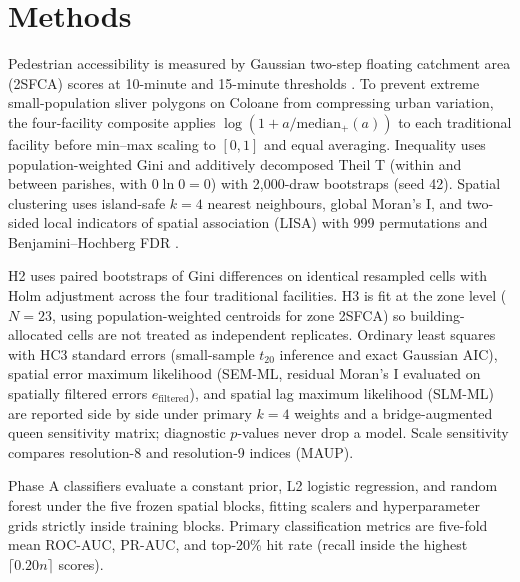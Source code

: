 \documentclass[11pt,a4paper]{article}
\begin{document}
\section{Methods}
Pedestrian accessibility is measured by Gaussian two-step floating catchment area (2SFCA) scores at 10-minute and 15-minute thresholds \citep{luo2003,dai2010}. To prevent extreme small-population sliver polygons on Coloane from compressing urban variation, the four-facility composite applies \(\log(1 + a / \mathrm{median}_{+}(a))\) to each traditional facility before min--max scaling to \([0,1]\) and equal averaging. Inequality uses population-weighted Gini and additively decomposed Theil T (within and between parishes, with \(0\ln 0 = 0\)) with 2,000-draw bootstraps (seed 42). Spatial clustering uses island-safe \(k=4\) nearest neighbours, global Moran's I, and two-sided local indicators of spatial association (LISA) with 999 permutations and Benjamini--Hochberg FDR \citep{anselin1995,bh1995}.

H2 uses paired bootstraps of Gini differences on identical resampled cells with Holm adjustment across the four traditional facilities. H3 is fit at the zone level (\(N=23\), using population-weighted centroids for zone 2SFCA) so building-allocated cells are not treated as independent replicates. Ordinary least squares with HC3 standard errors (small-sample \(t_{20}\) inference and exact Gaussian AIC), spatial error maximum likelihood (SEM-ML, residual Moran's I evaluated on spatially filtered errors \(e_{\mathrm{filtered}}\)), and spatial lag maximum likelihood (SLM-ML) are reported side by side under primary \(k=4\) weights and a bridge-augmented queen sensitivity matrix; diagnostic \(p\)-values never drop a model. Scale sensitivity compares resolution-8 and resolution-9 indices (MAUP).

Phase A classifiers evaluate a constant prior, L2 logistic regression, and random forest under the five frozen spatial blocks, fitting scalers and hyperparameter grids strictly inside training blocks. Primary classification metrics are five-fold mean ROC-AUC, PR-AUC, and top-20\% hit rate (recall inside the highest \(\lceil 0.20 n\rceil\) scores).
\end{document}

